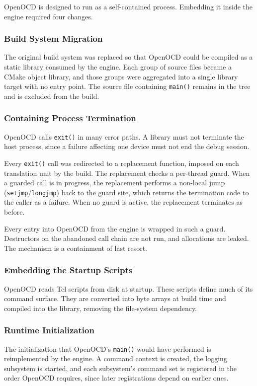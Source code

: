 OpenOCD is designed to run as a self-contained process. Embedding it inside the engine required four changes.

\subsubsection{Build System Migration}
The original build system was replaced so that OpenOCD could be compiled as a static library consumed by the engine. Each group of source files became a CMake object library, and those groups were aggregated into a single library target with no entry point. The source file containing \texttt{main()} remains in the tree and is excluded from the build.

\subsubsection{Containing Process Termination}
OpenOCD calls \texttt{exit()} in many error paths. A library must not terminate the host process, since a failure affecting one device must not end the debug session.

Every \texttt{exit()} call was redirected to a replacement function, imposed on each translation unit by the build. The replacement checks a per-thread guard. When a guarded call is in progress, the replacement performs a non-local jump (\texttt{setjmp}/\texttt{longjmp}) back to the guard site, which returns the termination code to the caller as a failure. When no guard is active, the replacement terminates as before.

Every entry into OpenOCD from the engine is wrapped in such a guard. Destructors on the abandoned call chain are not run, and allocations are leaked. The mechanism is a containment of last resort.

\subsubsection{Embedding the Startup Scripts}
OpenOCD reads Tcl scripts from disk at startup. These scripts define much of its command surface. They are converted into byte arrays at build time and compiled into the library, removing the file-system dependency.

\subsubsection{Runtime Initialization}
The initialization that OpenOCD's \texttt{main()} would have performed is reimplemented by the engine. A command context is created, the logging subsystem is started, and each subsystem's command set is registered in the order OpenOCD requires, since later registrations depend on earlier ones.

